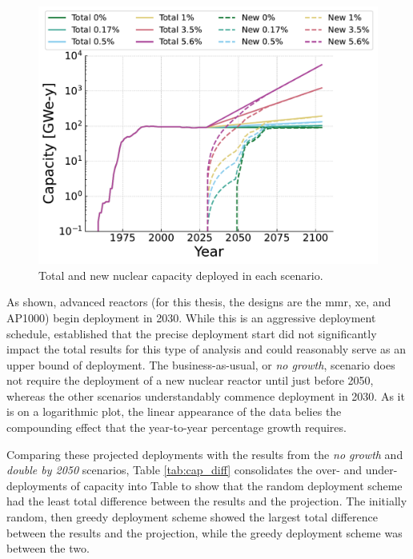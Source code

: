 \begin{figure}[H]
    \centering
    \includegraphics[scale=0.7]{images/results/deployment_calcs/total_new_capacity_scenarios.pdf}
    \caption{Total and new nuclear capacity deployed in each scenario.}
    \label{fig:dep_goals}
\end{figure}

As shown, advanced reactors (for this thesis, the designs are the \gls{mmr},
\gls{xe}, and AP1000) begin deployment in 2030. While this is an aggressive deployment schedule, \cite{bachmann_thesis_2023} established that the precise deployment start did not significantly impact the total results for this type of analysis and could reasonably serve as an upper bound of deployment. The business-as-usual, or \textit{no growth}, scenario does not require the deployment of a new nuclear reactor until just before 2050, whereas the other scenarios understandably commence deployment in 2030. As it is on a logarithmic plot, the linear appearance of the data belies the compounding effect that the year-to-year percentage growth requires.

Comparing these projected deployments with the results from the \textit{no growth} and \textit{double by 2050} scenarios, Table \ref{tab:cap_diff} consolidates the over- and under- deployments of capacity into Table to show that the random deployment scheme had the least total difference between the results and the projection. The initially random, then greedy deployment scheme showed the largest total difference between the results and the projection, while the greedy deployment scheme was between the two.

